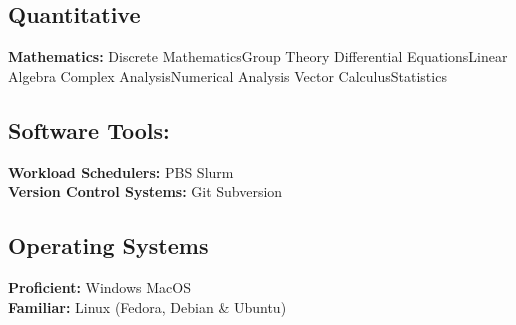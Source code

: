 \documentclass[letterpaper]{deedy-resume} %
\begin{document}
\begin{minipage}[t]{0.32\textwidth}
\sectionspace

\subsection{Quantitative}
\textbf{Mathematics:}
Discrete Mathematics\textbullet{}Group Theory
Differential Equations\textbullet{}\textbullet{}Linear Algebra
Complex Analysis\textbullet{}Numerical Analysis
Vector Calculus\textbullet{}Statistics

\sectionspace

\subsection{Software Tools:}
\textbf{Workload Schedulers:}	 PBS \textbullet{} Slurm\\
\textbf{Version Control Systems:}	Git \textbullet{} Subversion

\sectionspace

\subsection{Operating Systems}
\textbf{Proficient:}		Windows \textbullet{} MacOS\\
\textbf{Familiar:}	Linux (Fedora, Debian \& Ubuntu)


\end{minipage} %
%
%
\vspace{0pt}
\end{document}

